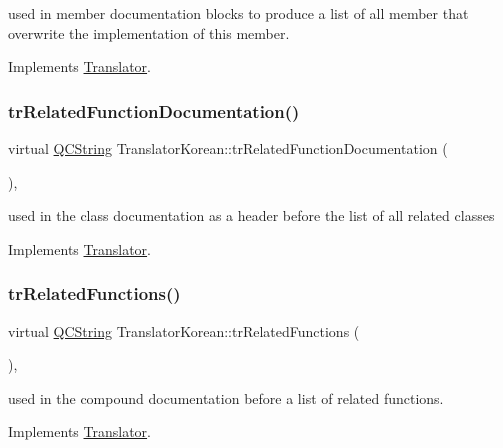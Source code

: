 used in member documentation blocks to produce a list of all member that overwrite the implementation of this member. 

Implements \mbox{\hyperlink{class_translator}{Translator}}.

\mbox{\label{class_translator_korean_a52706772f4cecda6b9ee119b823697fd}} 
\subsubsection{\texorpdfstring{trRelatedFunctionDocumentation()}{trRelatedFunctionDocumentation()}}
{\footnotesize\ttfamily virtual \mbox{\hyperlink{class_q_c_string}{Q\+C\+String}} Translator\+Korean\+::tr\+Related\+Function\+Documentation (\begin{DoxyParamCaption}{ }\end{DoxyParamCaption})\hspace{0.3cm}{\ttfamily [inline]}, {\ttfamily [virtual]}}

used in the class documentation as a header before the list of all related classes 

Implements \mbox{\hyperlink{class_translator}{Translator}}.

\mbox{\label{class_translator_korean_ae9fa94f5a3ef46d1e824f7c6e804dfad}} 
\subsubsection{\texorpdfstring{trRelatedFunctions()}{trRelatedFunctions()}}
{\footnotesize\ttfamily virtual \mbox{\hyperlink{class_q_c_string}{Q\+C\+String}} Translator\+Korean\+::tr\+Related\+Functions (\begin{DoxyParamCaption}{ }\end{DoxyParamCaption})\hspace{0.3cm}{\ttfamily [inline]}, {\ttfamily [virtual]}}

used in the compound documentation before a list of related functions. 

Implements \mbox{\hyperlink{class_translator}{Translator}}.

